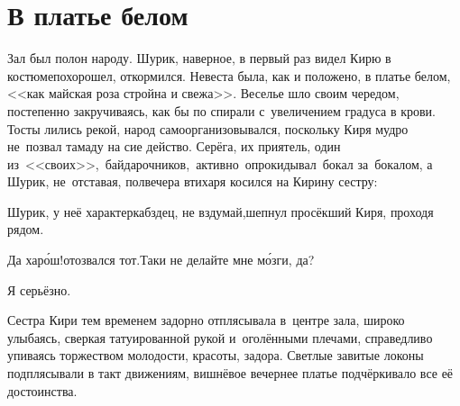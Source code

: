 {
\chapter{В платье белом}
\vepsianrose

\fancyhead[LE]{\fancyplain{}{\bfseries \parttitle}}
\fancyhead[RO]{\fancyplain{}{\bfseries \rightmark}}

Зал был полон народу. Шурик, наверное, в первый раз видел Кирю в костюме\mdash похорошел, откормился. Невеста была, как и положено, в платье белом, <<как майская роза стройна и свежа>>. Веселье шло своим чередом, постепенно закручиваясь, как бы по спирали с~увеличением градуса в крови. Тосты лились рекой, народ самоорганизовывался, поскольку Киря мудро не~позвал тамаду на сие действо. Серёга, их приятель, один из~<<своих>>,~байдарочников,~активно~опрокидывал~бокал за~бокалом, а Шурик, не~отставая, полвечера втихаря косился на Кирину сестру:

\diagdash Шурик, у неё характер\mdash кабздец, не вздумай,\mdash шепнул просёкший Киря, проходя рядом. 

\diagdash Да хар\'{о}ш!\mdash отозвался тот.\mdash Таки не делайте мне м\'{о}зги, да?

\diagdash Я серьёзно.

Сестра Кири тем временем задорно отплясывала в~центре зала, широко улыбаясь, сверкая татуированной рукой и~оголёнными плечами, справедливо упиваясь торжеством молодости, красоты, задора. Светлые завитые локоны подплясывали в такт движениям, вишнёвое вечернее платье подчёркивало все её достоинства. %

%
%
%

\noindent
\begin{minipage}{0.48\textwidth}
	\setlength{\parindent}{1.0cm}  %
	

\end{minipage}}
